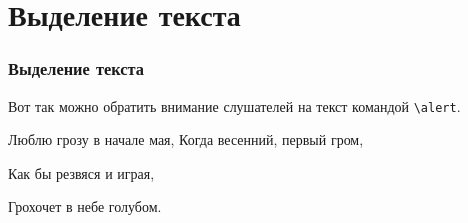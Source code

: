 \documentclass[10pt, hyperref={bookmarks=true}, aspectratio=169]{beamer}
\begin{document}

\section{Выделение текста}



\begin{frame}
\frametitle{Выделение текста}

Вот так можно обратить внимание слушателей \alert{на текст командой \texttt{\textbackslash alert}}.

\begin{block}{Люблю грозу в начале мая,}
  Когда весенний, первый гром,
\end{block}

\begin{alertblock}{Как бы резвяся}
  и играя,
\end{alertblock}

\begin{examples}
  Грохочет в небе голубом.
\end{examples}

\end{frame}
\end{document}
